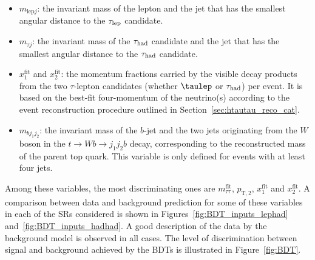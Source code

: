 \begin{itemize}
\item $m_{\text{lep}j}$: the invariant mass of the lepton and the jet that has the smallest angular distance to the $\tau_{\mathrm{lep}}$ candidate.
\item $m_{\tau j}$: the invariant mass of the  $\tau_{\mathrm{had}}$ candidate and the jet that has the smallest angular distance to the $\tau_{\mathrm{had}}$ candidate.
\item $x_{1}^{\text{fit}}$ and $x_{2}^{\text{fit}}$: the momentum fractions carried by the visible decay products from the two $\tau$-lepton candidates 
(whether $\taulep$ or $\tau_{\mathrm{had}}$) per event. It is based on the best-fit four-momentum of the neutrino(s) according to the event reconstruction procedure outlined in Section~\ref{sec:htautau_reco_cat}.
\item $m_{bj_1j_2}$: the invariant mass of the $b$-jet and the two jets originating from the $W$ boson in the $t\to Wb \to j_1j_2b$ decay, corresponding to the reconstructed mass of the parent top quark. This variable is only defined for events with at least four jets.
\end{itemize}

Among these variables, the most discriminating ones are $m_{\tau\tau}^{\text{fit}}$, $p_{\text{T},2}$, $x_{1}^{\text{fit}}$ and $x_{2}^{\text{fit}}$. A comparison between data and background prediction for some of these variables in each of the SRs considered is shown in Figures~\ref{fig:BDT_inputs_lephad} and~\ref{fig:BDT_inputs_hadhad}.
A good description of the data by the background model is observed in all cases.
The level of discrimination between signal and background achieved by the BDTs is illustrated in Figure~\ref{fig:BDT}.

